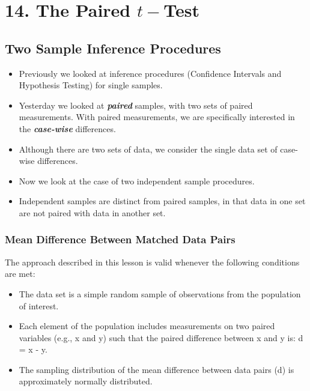 

\chapter{14. The Paired $t-$Test}




\section{Two Sample Inference Procedures}
\begin{itemize}
\item Previously we looked at inference procedures (Confidence Intervals and Hypothesis Testing) for single samples.
\item Yesterday we looked at \textit{\textbf{paired}} samples, with two sets of paired measurements. With paired measurements, we are specifically interested in the \textbf{\textit{case-wise}} differences.
\item Although there are two sets of data, we consider the single data set of case-wise differences.
\item Now we look at the case of two independent sample procedures.
\item Independent samples are distinct from paired samples, in that data in one set are not paired with data in another set.
\end{itemize}




\subsection{Mean Difference Between Matched Data Pairs}


The approach described in this lesson is valid whenever the following conditions are met:

\begin{itemize}
\item The data set is a simple random sample of observations from the population of interest.
\item Each element of the population includes measurements on two paired variables (e.g., x and y) such that the paired difference between x and y is: d = x - y.
\item The sampling distribution of the mean difference between data pairs (d) is approximately normally distributed.
\end{itemize}



